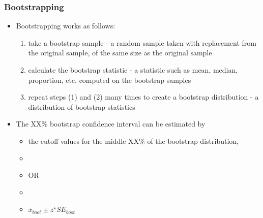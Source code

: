 \documentclass[slidestop,compress,mathserif,12pt,t,professionalfonts,xcolor=table]{beamer}
\begin{document}
\begin{frame}
\frametitle{Bootstrapping}

\begin{itemize}

\item Bootstrapping works as follows:
\pause
\begin{enumerate}[(1)]
\item take a bootstrap sample - a random sample taken with replacement from the original sample, of the same size as the original sample
\pause
\item calculate the bootstrap statistic - a statistic such as mean, median, proportion, etc. computed on the bootstrap samples
\pause
\item repeat steps (1) and (2) many times to create a bootstrap distribution - a distribution of bootstrap statistics
\end{enumerate}

\pause

\item The XX\% bootstrap confidence interval can be estimated by
\begin{itemize}
\pause
\item the cutoff values for the middle XX\% of the bootstrap distribution,
\item[]
\pause
\item[] OR
\item[]
\pause
\item $\bar{x}_{boot} \pm z^\star SE_{boot}$
\end{itemize}

\end{itemize}

\end{frame}

\end{document}
